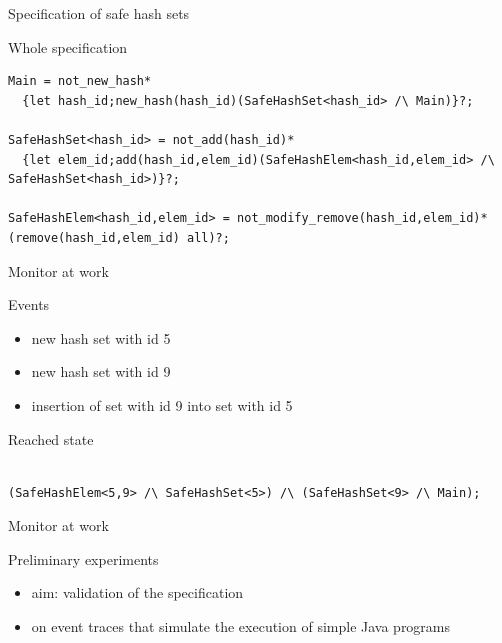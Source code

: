 \documentclass[10pt,usenames,dvipsnames]{beamer}
\begin{document}

\begin{frame}[fragile]{Specification of safe hash sets}
  \begin{block}{Whole specification}
    \begin{lstlisting}[basicstyle=\ttfamily\scriptsize]
Main = not_new_hash*
  {let hash_id;new_hash(hash_id)(SafeHashSet<hash_id> /\ Main)}?;

SafeHashSet<hash_id> = not_add(hash_id)*
  {let elem_id;add(hash_id,elem_id)(SafeHashElem<hash_id,elem_id> /\ SafeHashSet<hash_id>)}?;

SafeHashElem<hash_id,elem_id> = not_modify_remove(hash_id,elem_id)* (remove(hash_id,elem_id) all)?;
    \end{lstlisting}
  \end{block}
\end{frame}


\begin{frame}[fragile]{Monitor at work}
  \begin{block}{Events}
    \begin{itemize}
    \item  new hash set with id 5
    \item  new hash set with id 9
    \item insertion of set with id 9 into set with id 5  
    \end{itemize}
  \end{block}

  \begin{block}{Reached state}
    \begin{lstlisting}[basicstyle=\ttfamily\footnotesize]

(SafeHashElem<5,9> /\ SafeHashSet<5>) /\ (SafeHashSet<9> /\ Main);

    \end{lstlisting}
  \end{block}
\end{frame}


\begin{frame}[fragile]{Monitor at work}
  \begin{block}{Preliminary experiments}
    \begin{itemize}
    \item  aim: validation of the specification 
    \item  on event traces that simulate the  execution of simple Java programs
    \end{itemize}
  \end{block}
\end{frame}
\end{document}
